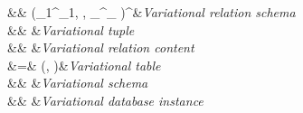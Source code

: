 \begin{figure}
\begin{syntax}
\synDef {\vRelSch} \vRelSchSet &\eqq& \vRel \left(\vAtt_1^{\dimMeta_1}, \cdots, \vAtt_{\numAtts}^{\dimMeta_\numAtts} \right)^\dimMeta &\textit{Variational relation schema}\\
\vTuple \in \mathbf{\vRelCont} &\eqq& &\textit{Variational tuple}\\
\vRelCont \in \vRelContSet &\eqq& \setDef {\vi \vTuple \numTuples}&\textit{Variational relation content}\\
\vTab  &=& (\vRelSch, \vRelCont)&\textit{Variational table}\\
\synDef \vSch \vSchSet &\eqq& \vSchDef &\textit{Variational schema}\\
\synDef \vdbInst  \vdbInstSet &\eqq& \setDef {\vi \vTab \numRels}&\textit{Variational database instance}
\end{syntax}


\end{figure}
